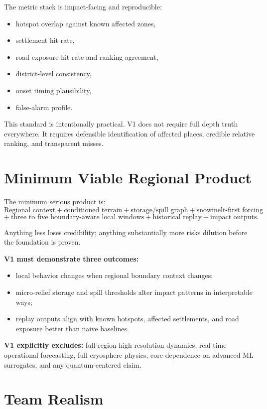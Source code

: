 \documentclass[11pt,a4paper]{article}
\begin{document}
The metric stack is impact-facing and reproducible:
\begin{itemize}
  \item hotspot overlap against known affected zones,
  \item settlement hit rate,
  \item road exposure hit rate and ranking agreement,
  \item district-level consistency,
  \item onset timing plausibility,
  \item false-alarm profile.
\end{itemize}

This standard is intentionally practical. V1 does not require full depth truth everywhere. It requires defensible identification of affected places, credible relative ranking, and transparent misses.

\section{Minimum Viable Regional Product}

The minimum serious product is:
\[
\text{Regional context} + \text{conditioned terrain} + \text{storage/spill graph} + \text{snowmelt-first forcing}
\]
\[
+\ \text{three to five boundary-aware local windows} + \text{historical replay} + \text{impact outputs}.
\]

Anything less loses credibility; anything substantially more risks dilution before the foundation is proven.

\textbf{V1 must demonstrate three outcomes:}
\begin{itemize}
  \item local behavior changes when regional boundary context changes;
  \item micro-relief storage and spill thresholds alter impact patterns in interpretable ways;
  \item replay outputs align with known hotspots, affected settlements, and road exposure better than naive baselines.
\end{itemize}

\textbf{V1 explicitly excludes:} full-region high-resolution dynamics, real-time operational forecasting, full cryosphere physics, core dependence on advanced ML surrogates, and any quantum-centered claim.

\section{Team Realism}
\end{document}
